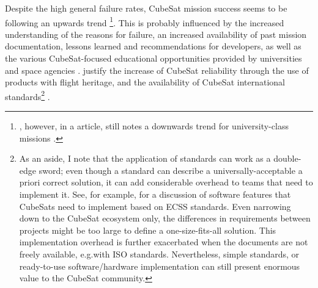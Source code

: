 \documentclass[a4paper,nobib,justified,final]{tufte-book}
\begin{document}
Despite the high general failure rates, CubeSat mission success seems to be following an upwards trend \cite{villelaThousandthCubeSatStatistical2019,swartwoutCubeSatMissionSuccess2019}\footnote{\citeauthor{swartwoutUniversityClassSpacecraft2023}, however, in a \citeyear{swartwoutUniversityClassSpacecraft2023} article, still notes a downwards trend for university-class missions \cite{swartwoutUniversityClassSpacecraft2023}.}. This is probably influenced by the increased understanding of the reasons for failure, an increased availability of past mission documentation, lessons learned and recommendations for developers, as well as the various CubeSat-focused educational opportunities provided by universities and space agencies \autocite{swartwoutUniversityClassSpacecraft2023}.
\citeauthor{villelaThousandthCubeSatStatistical2019} justify the increase of CubeSat reliability through the use of products with flight heritage, and the availability of CubeSat international standards\footnote{As an aside, I note that the application of standards can work as a double-edge sword; even though a standard can describe a universally-acceptable a priori correct solution, it can add considerable overhead to teams that need to implement it. See, for example,  for a discussion of software features that CubeSats need to implement based on \acs{ECSS} standards. Even narrowing down to the CubeSat ecosystem only, the differences in requirements between projects might be too large to define a one-size-fits-all solution. This implementation overhead is further exacerbated when the documents are not freely available, e.g.\@ with \acs{ISO} standards. Nevertheless, simple standards, or ready-to-use software/hardware implementation can still present enormous value to the CubeSat community.} \cite{villelaThousandthCubeSatStatistical2019}.
\end{document}
